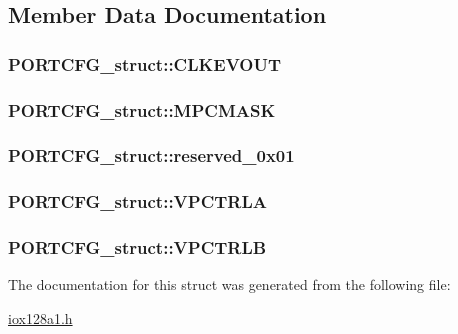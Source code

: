 \subsection{Member Data Documentation}
\hypertarget{struct_p_o_r_t_c_f_g__struct_ad5989612713da42329d0a3e4b26c692e}{
\subsubsection[{CLKEVOUT}]{ {\bf PORTCFG\_\-struct::CLKEVOUT}}}
\label{struct_p_o_r_t_c_f_g__struct_ad5989612713da42329d0a3e4b26c692e}
\hypertarget{struct_p_o_r_t_c_f_g__struct_a18137f5cc66037f33b8b2d9fbd93125a}{
\subsubsection[{MPCMASK}]{ {\bf PORTCFG\_\-struct::MPCMASK}}}
\label{struct_p_o_r_t_c_f_g__struct_a18137f5cc66037f33b8b2d9fbd93125a}
\hypertarget{struct_p_o_r_t_c_f_g__struct_a18f13a9d6b6a644d548e6008f876e327}{
\subsubsection[{reserved\_\-0x01}]{ {\bf PORTCFG\_\-struct::reserved\_\-0x01}}}
\label{struct_p_o_r_t_c_f_g__struct_a18f13a9d6b6a644d548e6008f876e327}
\hypertarget{struct_p_o_r_t_c_f_g__struct_a6fac78b86e90318e180ad682e84a3516}{
\subsubsection[{VPCTRLA}]{ {\bf PORTCFG\_\-struct::VPCTRLA}}}
\label{struct_p_o_r_t_c_f_g__struct_a6fac78b86e90318e180ad682e84a3516}
\hypertarget{struct_p_o_r_t_c_f_g__struct_a8819c9ec352e390fe1c9b28a6feb7d2e}{
\subsubsection[{VPCTRLB}]{ {\bf PORTCFG\_\-struct::VPCTRLB}}}
\label{struct_p_o_r_t_c_f_g__struct_a8819c9ec352e390fe1c9b28a6feb7d2e}


The documentation for this struct was generated from the following file:\begin{DoxyCompactItemize}
\item 
\hyperlink{iox128a1_8h}{iox128a1.h}\end{DoxyCompactItemize}

